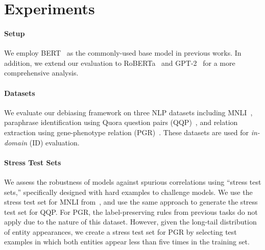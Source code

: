 \section{Experiments}

\paragraph{Setup}
We employ BERT~\citep{devlin-etal-2019-bert} as the commonly-used base model in previous works. In addition, we extend our evaluation to RoBERTa~\citep{liu2019roberta} and GPT-2~\citep{radford2019language} for a more comprehensive analysis.

\paragraph{Datasets} We evaluate our debiasing framework on three NLP datasets including 
MNLI~\citep{williams-etal-2018-broad}, 
paraphrase identification using Quora question pairs (QQP)~\citep{sharma2019natural}, and
relation extraction using gene-phenotype relation (PGR)~\citep{sousa-etal-2019-silver}. 
These datasets are used for {\em in-domain} (ID) evaluation.

\paragraph{Stress Test Sets} We assess the robustness of models against spurious correlations using ``stress test sets,'' specifically designed with hard examples to challenge models. 
We use the stress test set for MNLI from~\citep{naik-etal-2018-stress}, and
use the same approach to generate the stress test set for QQP.
For PGR, the label-preserving rules from previous tasks do not apply due to the nature of this dataset.
However, given the long-tail distribution of entity appearances, we create a stress test set for PGR by selecting test examples in which both entities appear less than five times in the training set.

